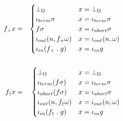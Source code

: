 \begin{multicols}{2}
\begin{eqnarray*}
          f_{+} x &=& \begin{cases}
                        \bot_{\Omega} & x = \bot_{\Omega} \\
                        \iota_{term} \sigma & x = \iota_{term} \sigma \\
                        f \sigma & x = \iota_{abort} \sigma \\
                        \iota_{out}(n, f_{+} \omega) & x = \iota_{out}(n, \omega) \\ 
                        \iota_{in}(f_{+} \; . \; g) & x = \iota_{in} g 
                      \end{cases} \\ \\
                      f_{\dag} x &=& \begin{cases}
                        \bot_{\Omega} & x = \bot_{\Omega} \\
                        \iota_{term}(f \sigma) & x = \iota_{term} \sigma \\
                        \iota_{abort}(f \sigma) & x = \iota_{abort} \sigma \\
                        \iota_{out}(n, f_{\dag} \omega) & x = \iota_{out}(n, \omega) \\
                        \iota_{in}(f_{\dag} \; . \; g) & x = \iota_{in} g 
                      \end{cases}
      \end{eqnarray*}
    \end{multicols}


